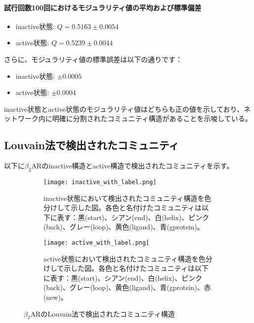 \paragraph{試行回数100回におけるモジュラリティ値の平均および標準偏差}
\begin{itemize}
    \item inactive状態: \( Q = 0.5163 \pm 0.0054 \)
    \item active状態: \( Q = 0.5239 \pm 0.0044 \)
\end{itemize}
さらに、モジュラリティ値の標準誤差は以下の通りです：
\begin{itemize}
    \item inactive状態: \( \pm 0.0005 \)
    \item active状態: \( \pm 0.0004 \)
\end{itemize}

inactive状態とactive状態のモジュラリティ値はどちらも正の値を示しており、ネットワーク内に明確に分割されたコミュニティ構造があることを示唆している。

\subsection{Louvain法で検出されたコミュニティ}

以下に$\beta_2$ARのinactive構造とactive構造で検出されたコミュニティを示す。

\begin{figure}[htbp]
    \centering
    \begin{subfigure}{0.40\textwidth} %
      \centering
      \texttt{[image: inactive\_with\_label.png]}
      \caption{inactive状態において検出されたコミュニティ構造を色分けして示した図。各色と名付けたコミュニティは以下に表す：黒(start)、シアン(end)、白(helix)、ピンク(back)、グレー(loop)、黄色(ligand)、青(gprotein)。}
      \label{fig:inactive_community}
    \end{subfigure}
    \hspace{0.02\textwidth} %
    \begin{subfigure}{0.48\textwidth}
      \centering
      \texttt{[image: active\_with\_label.png]}
      \caption{active状態において検出されたコミュニティ構造を色分けして示した図。各色と名付けたコミュニティは以下に表す：黒(start)、シアン(end)、白(helix)、ピンク(back)、グレー(loop)、黄色(ligand)、青(gprotein)、赤(new)。}
      \label{fig:active_community}
    \end{subfigure}
    \caption{$\beta_2$ARのLouvain法で検出されたコミュニティ構造}
    \label{fig:community-all}
  \end{figure}

